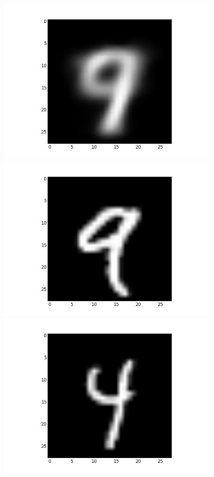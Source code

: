 \documentclass[submit]{harvardml}
\begin{document}
\begin{figure}[ht]
    \centering
    \includegraphics[scale=0.20]{mean-1}
    \includegraphics[scale=0.20]{representative-1-0}
    \includegraphics[scale=0.20]{representative-1-1}

\end{figure}
\end{document}

